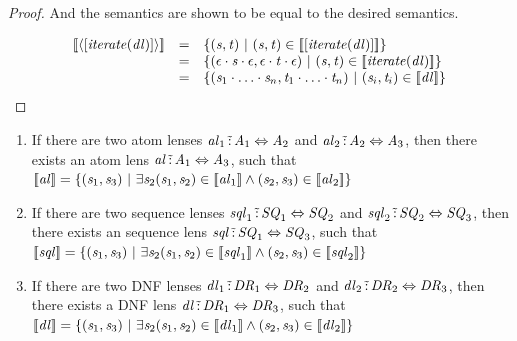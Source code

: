 \documentclass[numbers]{sigplanconf}
\begin{document}
\begin{proof}
  And the semantics are shown to be equal to the desired semantics.

  \[
    \begin{array}{rcl}
      \SemanticsOf{\DNFLensOf{\SequenceLensOf{\IterateLensOf{\DNFLens}}}}
      & = &
            \SetOf{
            (\String,\StringAlt)
            \SuchThat
            (\String,\StringAlt)\in\SemanticsOf{\SequenceLensOf{\IterateLensOf{\DNFLens}}}}\\
      & = &
            \SetOf{
            (\EmptyString\Concat\String\Concat\EmptyString,\EmptyString\Concat\StringAlt\Concat\EmptyString)
            \SuchThat
            (\String,\StringAlt)\in\SemanticsOf{\IterateLensOf{\DNFLens}}}\\
      & = &
            \SetOf{
            (\String_1\Concat\ldots\Concat\String_n,\StringAlt_1\Concat\ldots\Concat\StringAlt_n)
            \SuchThat
            (\String_i,\StringAlt_i)\in\SemanticsOf{\DNFLens}}
    \end{array}
  \]
  
\end{proof}

\begin{lemma}
  \leavevmode
  \label{lem:composition-completeness}
  \begin{enumerate}
  \item If there are two atom lenses
    $\mathit{al}_1 \,\tilde{:}\, \mathit{A}_1 \Leftrightarrow \mathit{A}_2$ and
    $\mathit{al}_2 \,\tilde{:}\, \mathit{A}_2 \Leftrightarrow \mathit{A}_3$,
    then there exists an atom lens
    $\mathit{al} \,\tilde{:}\, \mathit{A}_1 \Leftrightarrow \mathit{A}_3$, such that
    $[ \! [\mathit{al}] \! ]=\{(\mathit{s}_1,\mathit{s}_3)~|~
      \exists\mathit{s}_2
      (\mathit{s}_1,\mathit{s}_2)\in[ \! [\mathit{al}_1] \! ]\wedge
      (\mathit{s}_2,\mathit{s}_3)\in[ \! [\mathit{al}_2] \! ]\}$

  \item If there are two sequence lenses
    $\mathit{sql}_1 \,\tilde{:}\, \mathit{SQ}_1 \Leftrightarrow \mathit{SQ}_2$ and
    $\mathit{sql}_2 \,\tilde{:}\, \mathit{SQ}_2 \Leftrightarrow \mathit{SQ}_3$,
    then there exists an sequence lens
    $\mathit{sql} \,\tilde{:}\, \mathit{SQ}_1 \Leftrightarrow \mathit{SQ}_3$, such that
    $[ \! [\mathit{sql}] \! ]=\{(\mathit{s}_1,\mathit{s}_3)~|~
      \exists\mathit{s}_2
      (\mathit{s}_1,\mathit{s}_2)\in[ \! [\mathit{sql}_1] \! ]\wedge
      (\mathit{s}_2,\mathit{s}_3)\in[ \! [\mathit{sql}_2] \! ]\}$

  \item If there are two DNF lenses
    $\mathit{dl}_1 \,\tilde{:}\, \mathit{DR}_1 \Leftrightarrow \mathit{DR}_2$ and
    $\mathit{dl}_2 \,\tilde{:}\, \mathit{DR}_2 \Leftrightarrow \mathit{DR}_3$,
    then there exists a DNF lens
    $\mathit{dl} \,\tilde{:}\, \mathit{DR}_1 \Leftrightarrow \mathit{DR}_3$, such that
    $[ \! [\mathit{dl}] \! ]=\{(\mathit{s}_1,\mathit{s}_3)~|~
      \exists\mathit{s}_2
      (\mathit{s}_1,\mathit{s}_2)\in[ \! [\mathit{dl}_1] \! ]\wedge
      (\mathit{s}_2,\mathit{s}_3)\in[ \! [\mathit{dl}_2] \! ]\}$
  \end{enumerate}
\end{lemma}
\end{document}
